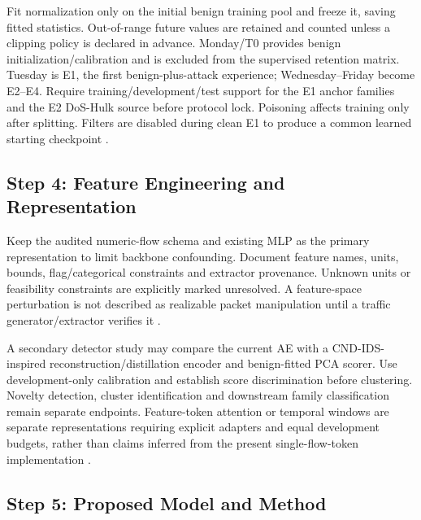 \documentclass[10pt,a4paper]{article}
\begin{document}
Fit normalization only on the initial benign training pool and freeze it, saving fitted statistics. Out-of-range future values are retained and counted unless a clipping policy is declared in advance. Monday/T0 provides benign initialization/calibration and is excluded from the supervised retention matrix. Tuesday is E1, the first benign-plus-attack experience; Wednesday--Friday become E2--E4. Require training/development/test support for the E1 anchor families and the E2 DoS-Hulk source before protocol lock. Poisoning affects training only after splitting. Filters are disabled during clean E1 to produce a common learned starting checkpoint \cite{cic2017,repo}.

\subsection{Step 4: Feature Engineering and Representation}
Keep the audited numeric-flow schema and existing MLP as the primary representation to limit backbone confounding. Document feature names, units, bounds, flag/categorical constraints and extractor provenance. Unknown units or feasibility constraints are explicitly marked unresolved. A feature-space perturbation is not described as realizable packet manipulation until a traffic generator/extractor verifies it \cite{repo,cerasuolo}.

A secondary detector study may compare the current AE with a CND-IDS-inspired reconstruction/distillation encoder and benign-fitted PCA scorer. Use development-only calibration and establish score discrimination before clustering. Novelty detection, cluster identification and downstream family classification remain separate endpoints. Feature-token attention or temporal windows are separate representations requiring explicit adapters and equal development budgets, rather than claims inferred from the present single-flow-token implementation \cite{cnd,repo}.

\subsection{Step 5: Proposed Model and Method}
\end{document}
